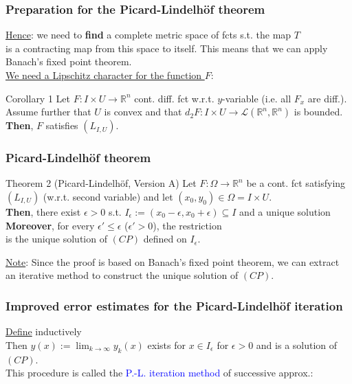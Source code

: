\documentclass[10pt]{beamer}
\newcommand{\R}{\mathbb{R}}
\begin{document}
{\begin{frame}\frametitle{Preparation for the Picard-Lindelhöf theorem}
\underline{Hence}: we need to \textbf{find} a complete metric space of fcts  s.t. the map $T$\\
\vspace{0.5cm}
is a contracting map from this space to itself. This means that we can apply Banach's fixed point theorem.\\
\vspace{0.2cm}
\underline{We need a Lipschitz character for the function $F$}:\\
\begin{block}{}
\vspace{2cm}
\end{block}
\begin{block}{Corollary 1}
Let $F:I \times U \rightarrow \R^n$ cont.  diff.  fct w.r.t. $y$-variable (i.e. all $F_x$ are diff.). 
Assume further that $U$ is convex and that $d_2F:I \times U \rightarrow \mathcal{L}(\R^n,\R^n)$ is bounded.\\
\textbf{Then}, $F$ satisfies $(L_{I,U})$.
\end{block}
\end{frame}

\begin{frame}\frametitle{Picard-Lindelhöf theorem}
\begin{block}{Theorem 2 (Picard-Lindelhöf,  Version A)}
Let $F: \Omega \rightarrow \R^n$ be a cont. fct satisfying $(L_{I,U})$ (w.r.t. second variable) and let $(x_0,y_0) \in \Omega=I \times U.$\\
\textbf{Then}, there exist $\epsilon >0$ s.t. $I_\epsilon:=(x_0-\epsilon, x_0+\epsilon) \subseteq I$ and a unique solution
$$\;$$
\vspace{0.2cm}
\textbf{Moreover}, for every $\epsilon' \leq \epsilon$ ($\epsilon' >0$), the restriction
$$\;$$
is the unique solution of $(CP)$ defined on $I_\epsilon$.
\end{block}
\vspace{0.2cm}
\underline{Note}:
Since the proof is based on Banach's fixed point theorem, we can extract an iterative method to construct the unique solution of $(CP)$. 
\end{frame}

\begin{frame}\frametitle{Improved error estimates for the Picard-Lindelhöf iteration}
\underline{Define} inductively\\
\vspace{0.5cm}
Then $y(x):=\lim_{k\rightarrow \infty} y_k(x)$ exists for $x\in I_\epsilon$ for $\epsilon>0$ and is a solution of $(CP)$.\\
This procedure is called the \textcolor{blue}{P.-L. iteration method} of successive approx.:


\end{frame}}
\end{document}
